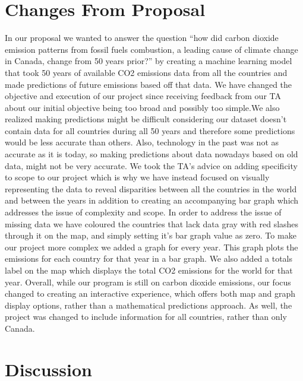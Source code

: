 \documentclass[fontsize=11pt]{article}
\begin{document}
\section*{Changes From Proposal}
In our proposal we wanted to answer the question “how did carbon dioxide emission patterns from fossil fuels combustion, a leading cause of climate change in Canada, change from 50 years prior?” by creating a machine learning model that took 50 years of available CO2 emissions data from all the countries and made predictions of future emissions based off that data. We have changed the objective and execution of our project since receiving feedback from our TA about our initial objective being too broad and possibly too simple.We also realized making predictions might be difficult considering our dataset doesn’t contain data for all countries during all 50 years and therefore some predictions would be less accurate than others. Also, technology in the past was not as accurate as it is today, so making predictions about data nowadays based on old data, might not be very accurate. We took the TA’s advice on adding specificity to scope to our project which is why we have instead focused on visually representing the data to reveal disparities between all the countries in the world and between the years in addition to creating an accompanying bar graph which addresses the issue of complexity and scope. In order to address the issue of missing data we have coloured the countries that lack data gray with red slashes through it on the map, and simply setting it’s bar graph value as zero. To make our project more complex we added a graph for every year. This graph plots the emissions for each country for that year in a bar graph. We also added a totals label on the map which displays the total CO2 emissions for the world for that year. Overall, while our program is still on carbon dioxide emissions, our focus changed to creating an interactive experience, which offers both map and graph display options, rather than a mathematical predictions approach. As well, the project was changed to include information for all countries, rather than only Canada. 
\section*{Discussion}
\end{document}
